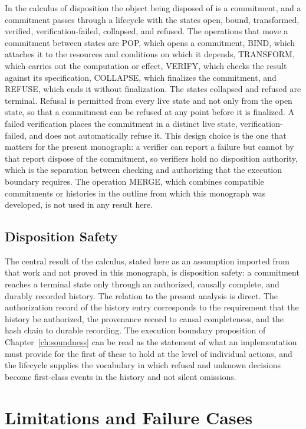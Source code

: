 In the calculus of disposition the object being disposed of is a commitment, and a commitment passes through a lifecycle with the states open, bound, transformed, verified, verification-failed, collapsed, and refused. The operations that move a commitment between states are POP, which opens a commitment, BIND, which attaches it to the resources and conditions on which it depends, TRANSFORM, which carries out the computation or effect, VERIFY, which checks the result against its specification, COLLAPSE, which finalizes the commitment, and REFUSE, which ends it without finalization. The states collapsed and refused are terminal. Refusal is permitted from every live state and not only from the open state, so that a commitment can be refused at any point before it is finalized. A failed verification places the commitment in a distinct live state, verification-failed, and does not automatically refuse it. This design choice is the one that matters for the present monograph: a verifier can report a failure but cannot by that report dispose of the commitment, so verifiers hold no disposition authority, which is the separation between checking and authorizing that the execution boundary requires. The operation MERGE, which combines compatible commitments or histories in the outline from which this monograph was developed, is not used in any result here.

\section*{Disposition Safety}

The central result of the calculus, stated here as an assumption imported from that work and not proved in this monograph, is disposition safety: a commitment reaches a terminal state only through an authorized, causally complete, and durably recorded history. The relation to the present analysis is direct. The authorization record of the history entry corresponds to the requirement that the history be authorized, the provenance record to causal completeness, and the hash chain to durable recording. The execution boundary proposition of Chapter~\ref{ch:soundness} can be read as the statement of what an implementation must provide for the first of these to hold at the level of individual actions, and the lifecycle supplies the vocabulary in which refusal and unknown decisions become first-class events in the history and not silent omissions.

\chapter{Limitations and Failure Cases}
\label{app:limits}

